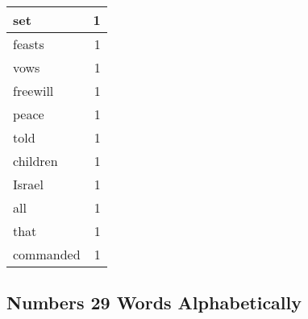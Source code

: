 \begin{center}
\begin{longtable}{l|r}
set & 1\\ \hline 
feasts & 1\\ \hline 
vows & 1\\ \hline 
freewill & 1\\ \hline 
peace & 1\\ \hline 
told & 1\\ \hline 
children & 1\\ \hline 
Israel & 1\\ \hline 
all & 1\\ \hline 
that & 1\\ \hline 
commanded & 1\\ \hline 
\end{longtable}
\end{center}





\subsection{Numbers 29 Words Alphabetically}


\normalsize
 
